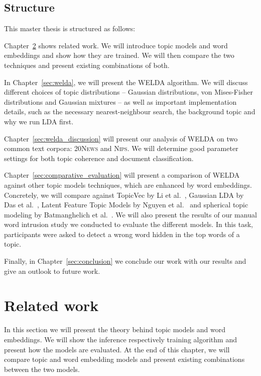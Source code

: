 \documentclass[
        a4paper,
        titlepage,
        twoside,
        parskip,
        numbers=noenddot
        ]{scrbook}
\theoremstyle{break}
\begin{document}
\section{Structure}
This master thesis is structured as follows:

\noindent Chapter~\ref{sec:related_work} shows related work.
We will introduce topic models and word embeddings and show how they are trained.
We will then compare the two techniques and present existing combinations of both.

\noindent In Chapter~\ref{sec:welda}, we will present the WELDA algorithm.
We will discuss different choices of topic distributions -- Gaussian distributions, von Mises-Fisher distributions and Gaussian mixtures -- as well as important implementation details, such as the necessary nearest-neighbour search, the background topic and why we run LDA first.

\noindent Chapter~\ref{sec:welda_discussion} will present our analysis of WELDA on two common text corpora: \textsc{20News} and \textsc{Nips}.
We will determine good parameter settings for both topic coherence and document classification.

\noindent Chapter~\ref{sec:comparative_evaluation} will present a comparison of WELDA against other topic models techniques, which are enhanced by word embeddings.
Concretely, we will compare against TopicVec by Li et al.~\cite{Li2016}, Gaussian LDA by Das et al.~\cite{Das2015}, Latent Feature Topic Models by Nguyen et al.~\cite{Nguyen2015} and spherical topic modeling by Batmanghelich et al.~\cite{Batmanghelich2016}.
We will also present the results of our manual word intrusion study we conducted to evaluate the different models.
In this task, participants were asked to detect a wrong word hidden in the top words of a topic.

\noindent Finally, in Chapter~\ref{sec:conclusion} we conclude our work with our results and give an outlook to future work.

\chapter{Related work}
\label{sec:related_work}
In this section we will present the theory behind topic models and word embeddings.
We will show the inference respectively training algorithm and present how the models are evaluated.
At the end of this chapter, we will compare topic and word embedding models and present existing combinations between the two models.
\end{document}
